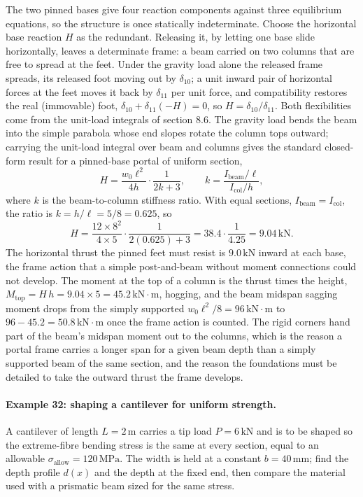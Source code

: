 The two pinned bases give four reaction components against three
equilibrium equations, so the structure is once statically indeterminate.
Choose the horizontal base reaction $H$ as the redundant. Releasing it,
by letting one base slide horizontally, leaves a determinate frame: a beam
carried on two columns that are free to spread at the feet. Under the
gravity load alone the released frame spreads, its released foot moving out
by $\delta_{10}$; a unit inward pair of horizontal forces at the feet moves
it back by $\delta_{11}$ per unit force, and compatibility restores the
real (immovable) foot, $\delta_{10} + \delta_{11}(-H) = 0$, so $H =
\delta_{10}/\delta_{11}$. Both flexibilities come from the unit-load
integrals of section 8.6. The gravity load bends the beam into the simple
parabola whose end slopes rotate the column tops outward; carrying the
unit-load integral over beam and columns gives the standard closed-form
result for a pinned-base portal of uniform section,
\[
H = \frac{w_0 \ell^2}{4h}\cdot\frac{1}{2k + 3}, \qquad
k = \frac{I_{\text{beam}}/\ell}{I_{\text{col}}/h},
\]
where $k$ is the beam-to-column stiffness ratio. With equal sections,
$I_{\text{beam}} = I_{\text{col}}$, the ratio is $k = h/\ell = 5/8 =
0.625$, so
\[
H = \frac{12 \times 8^2}{4 \times 5}\cdot\frac{1}{2(0.625) + 3}
= 38.4\cdot\frac{1}{4.25} = 9.04\,\text{kN}.
\]
The horizontal thrust the pinned feet must resist is $9.0\,\text{kN}$
inward at each base, the frame action that a simple post-and-beam without
moment connections could not develop. The moment at the top of a column is
the thrust times the height, $M_{\text{top}} = H\,h = 9.04 \times 5 =
45.2\,\text{kN}\cdot\text{m}$, hogging, and the beam midspan sagging moment
drops from the simply supported $w_0\ell^2/8 = 96\,\text{kN}\cdot\text{m}$
to $96 - 45.2 = 50.8\,\text{kN}\cdot\text{m}$ once the frame action is
counted. The rigid corners hand part of the beam's midspan moment out to
the columns, which is the reason a portal frame carries a longer span for a
given beam depth than a simply supported beam of the same section, and the
reason the foundations must be detailed to take the outward thrust the
frame develops.

\paragraph{Example 32: shaping a cantilever for uniform strength.} A
cantilever of length $L = 2\,\si{\meter}$ carries a tip load $P =
6\,\text{kN}$ and is to be shaped so the extreme-fibre bending stress is
the same at every section, equal to an allowable $\sigma_{\text{allow}} =
120\,\text{MPa}$. The width is held at a constant $b = 40\,\si{\milli
\meter}$; find the depth profile $d(x)$ and the depth at the fixed end,
then compare the material used with a prismatic beam sized for the same
stress.

